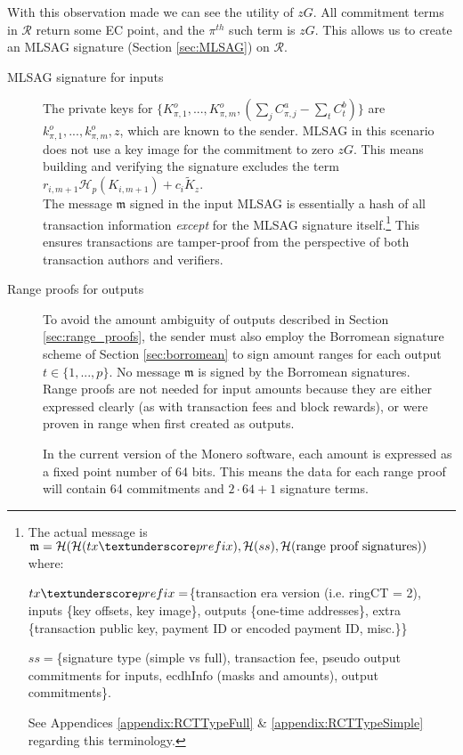 With this observation made we can see the utility of $z G$. All commitment terms in $\mathcal{R}$ return some EC point, and the $\pi^{th}$ such term is $z G$. This allows us to create an MLSAG signature (Section \ref{sec:MLSAG}) on $\mathcal{R}$.


\begin{description}%
	
	\item [MLSAG signature for inputs]
	The private keys for 
	\(\{K_{\pi,1}^o,...,K_{\pi,m}^o, (\sum\limits_j C_{\pi, j}^a - \sum\limits_t C^b_{t})\}\)
	are \(k_{\pi,1}^o,...,k_{\pi,m}^o, z\), which are known to the sender. 
	MLSAG in this scenario does not use a key image for the commitment to zero $z G$. This means building and verifying the signature excludes the term $r_{i,m+1} \mathcal{H}_p(K_{i,m+1}) + c_i \tilde{K}_z$.\\
	
	The message $\mathfrak{m}$ signed in the input MLSAG is essentially a hash of all transaction information {\em except} for the MLSAG signature itself.\footnote{\label{MLSAG_message}The actual message is $\mathfrak{m} = \mathcal{H}(\mathcal{H}(tx\textunderscore prefix),\mathcal{H}(ss),\mathcal{H}(\text{range proof signatures}))$ where:\par
	$tx\textunderscore prefix = $\{transaction era version (i.e. ringCT = 2), inputs \{key offsets, key image\}, outputs \{one-time addresses\}, extra \{transaction public key, payment ID or encoded payment ID, misc.\}\}\par
	$ss = $\{signature type (simple vs full), transaction fee, pseudo output commitments for inputs, ecdhInfo (masks and amounts), output commitments\}.\par
	See Appendices \ref{appendix:RCTTypeFull} \& \ref{appendix:RCTTypeSimple} regarding this terminology.} This ensures transactions are tamper-proof from the perspective of both transaction authors and verifiers.
	
	\item[Range proofs for outputs]
	To avoid the amount ambiguity of outputs described in Section  \ref{sec:range_proofs}, the sender must also employ the Borromean signature scheme of Section \ref{sec:borromean} to sign amount ranges for each output $t \in \{1, ..., p\}$. No message $\mathfrak{m}$ is signed by the Borromean signatures.\\
	
	Range proofs are not needed for input amounts because they are either expressed clearly (as with transaction fees and block rewards), or were proven in range when first created as outputs.
	
	In the current version of the Monero software, each amount is expressed as a fixed point number of 64 bits. This means the data for each range proof will contain 64 commitments and $2 \cdot 64 + 1$ signature terms.
	
\end{description}


